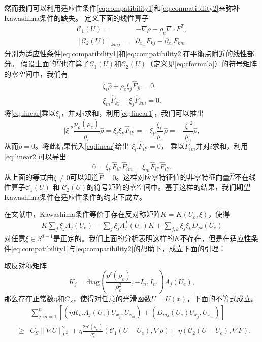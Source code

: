 然而我们可以利用适应性条件\eqref{eq:compatibility1}和\eqref{eq:compatibility2}来弥补Kawashima条件的缺失。
定义下面的线性算子
 \begin{eqnarray}\label{eq:cformula}
 {\mathcal C}_1(U) = & -\nabla\rho - \rho_e \nabla\cdot F^T, \nonumber \\
 {[{\mathcal C}_2(U)]}_{kmj} = & \partial_{x_m} F_{kj} - \partial_{x_j} F_{km}
 \end{eqnarray}
分别为适应性条件\eqref{eq:compatibility1}和\eqref{eq:compatibility2}在平衡点附近的线性部分。
假设上面的$\hat{U}$也在算子${\mathcal C}_1(U)$和${\mathcal C}_2(U)$（定义见\eqref{eq:cformula}）的符号矩阵的零空间中，我们有
\begin{eqnarray}
\xi_i \hat{\rho} + \rho_e \xi_{j} \hat{F}_{ji} = 0 , \label{eq:linear1}\\
\xi_{m} \hat{F}_{kj} - \xi_{j} \hat{F}_{km} =0. \label{eq:linear2}
\end{eqnarray}
将\eqref{eq:linear}乘以$\xi_i$，并对$i$求和，利用\eqref{eq:linear1}，我们可以推出
$$
|\xi|^2 \frac{p_\rho(\rho_e)}{\rho_e} \hat{\rho}  =  \xi_i \xi_{l'} \hat{F}_{il'}  = - \xi_{l'} \frac{\xi_{l'}  }{\rho_e} \hat{\rho} = -\frac{|\xi|^2}{\rho_e} \hat{\rho},
$$
从而$\hat{\rho}=0$。将此结果代入\eqref{eq:linear}给出
 $\xi_{l'} \hat{F}_{il'} = 0 $，
乘以$\hat{F}_{im}$并对$i$求和，利用\eqref{eq:linear2}可以导出
$$0=\xi_{l'} \hat{F} _{il'} \hat{F}_{im} = \xi_m \hat{F} _{il'}\hat{F} _{il'}.$$
从上面的等式由$\xi \neq 0$可以知道$\hat{F}=0$。这样对应零特征值的非零特征向量$\hat{U}$不在线性算子${\mathcal C}_1(U)$ 和 ${\mathcal C}_2(U)$的符号矩阵的零空间中。基于这样的结果，我们期望Kawashima条件在适应性条件的约束下成立。

在文献\cite{shizuta1985systems}中，Kawashima条件等价于存在反对称矩阵$K=K(U_e, \xi)$，使得
\begin{eqnarray*}
  K\sum_{j}\xi_j A_j(U_e) - \sum_{j}\xi_j A_j^T(U_e)K + \sum_{j, k}\xi_j\xi_kD_{jk}(U_e)
\end{eqnarray*}
对任意$\xi\in S^{d-1}$是正定的。我们上面的分析表明这样的$K$不存在，但是在适应性条件\eqref{eq:compatibility1}与\eqref{eq:compatibility2}的帮助下，成立下面的引理：
\begin{lemma}\label{lemmaK}
取反对称矩阵
$$
K_j = \mbox{diag}\left(\frac{p'(\rho_e)}{\rho_e^2}, -I_n, I_{n^2}\right)A_j(U_e),
$$
那么存在正常数$\eta$和$C_S$，使得对任意的光滑函数$U =U(x)$，下面的不等式成立。
\begin{eqnarray}\label{eq:prop}
  &&\sum_{j,m=1}^n [( \eta K_m A_j(U_e) U_{x_j},U_{x_m}) + (D_{mj}(U_e) U_{x_j},U_{x_m})]\nonumber \\
  &\ge& C_S \|\nabla U \|_{L^2}^2 +\eta\frac{2p'(\rho_e)}{\rho_e^2}({\mathcal C}_1(U - U_e), \nabla \rho) + \eta({\mathcal C}_2(U - U_e), \nabla F).
\end{eqnarray}

\end{lemma}

